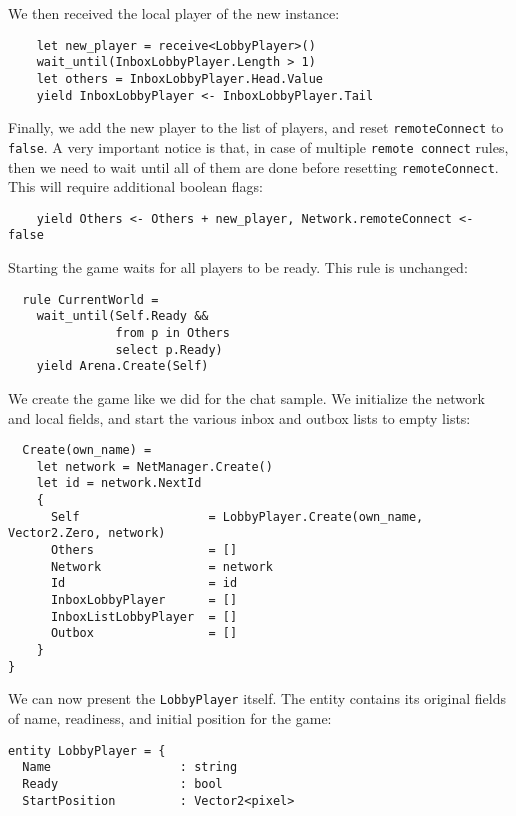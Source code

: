 We then received the local player of the new instance:

\begin{lstlisting}
    let new_player = receive<LobbyPlayer>()
    wait_until(InboxLobbyPlayer.Length > 1)
    let others = InboxLobbyPlayer.Head.Value
    yield InboxLobbyPlayer <- InboxLobbyPlayer.Tail
\end{lstlisting}

Finally, we add the new player to the list of players, and reset \texttt{remoteConnect} to \texttt{false}. A very important notice is that, in case of multiple \texttt{remote connect} rules, then we need to wait until all of them are done before resetting \texttt{remoteConnect}. This will require additional boolean flags:

\begin{lstlisting}
    yield Others <- Others + new_player, Network.remoteConnect <- false
\end{lstlisting}

Starting the game waits for all players to be ready. This rule is unchanged:

\begin{lstlisting}
  rule CurrentWorld = 
    wait_until(Self.Ready &&
               from p in Others
               select p.Ready)
    yield Arena.Create(Self)
\end{lstlisting}

We create the game like we did for the chat sample. We initialize the network and local fields, and start the various inbox and outbox lists to empty lists:

\begin{lstlisting}
  Create(own_name) = 
    let network = NetManager.Create()
    let id = network.NextId
    {
      Self                  = LobbyPlayer.Create(own_name, Vector2.Zero, network)
      Others                = []
      Network               = network
      Id                    = id
      InboxLobbyPlayer      = []
      InboxListLobbyPlayer  = []
      Outbox                = []
    }
}
\end{lstlisting}

We can now present the \texttt{LobbyPlayer} itself. The entity contains its original fields of name, readiness, and initial position for the game:

\begin{lstlisting}
entity LobbyPlayer = {
  Name                  : string
  Ready                 : bool
  StartPosition         : Vector2<pixel>
\end{lstlisting}

